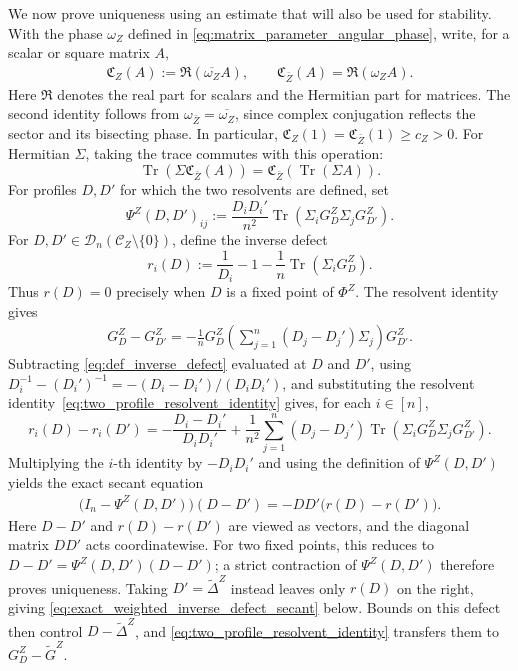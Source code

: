 \documentclass[EJP, preprint, NODS, nobera, nofontexpansion]{ejpecp}
\DeclareMathOperator{\tr}{Tr}
\begin{document}
We now prove uniqueness using an estimate that will also be used for
stability. With the phase \(\omega_Z\) defined in
\eqref{eq:matrix_parameter_angular_phase}, write, for a scalar or square
matrix \(A\),
\begin{align}\label{eq:def_weighted_real_part}
    \mathfrak C_Z(A)
    :=\Re(\overline{\omega_Z}A),
    \qquad
    \mathfrak C_{\bar Z}(A)
    =\Re(\omega_Z A).
\end{align}
Here \(\Re\) denotes the real part for scalars and the Hermitian part for
matrices. The second identity follows from
\(\omega_{\bar Z}=\overline{\omega_Z}\), since complex conjugation reflects
the sector and its bisecting phase. In particular,
\(\mathfrak C_Z(1)=\mathfrak C_{\bar Z}(1)\geq c_Z>0\).
For Hermitian \(\Sigma\), taking the trace commutes with this operation:
\[
    \tr\!\left(\Sigma\mathfrak C_{\bar Z}(A)\right)
    =\mathfrak C_{\bar Z}\!\left(\tr(\Sigma A)\right).
\]
For profiles \(D,D'\) for which the two resolvents are defined, set
\[
    \Psi^Z(D,D')_{ij}
    :=
    \frac{D_iD_i'}{n^2}
    \tr\!\left(
        \Sigma_iG_D^Z\Sigma_jG_{D'}^Z
    \right).
\]
For \(D,D'\in\mathcal D_n(\mathcal C_Z\setminus\{0\})\), define the
inverse defect
\begin{equation}\label{eq:def_inverse_defect}
    r_i(D):=\frac1{D_i}-1-\frac1n\tr(\Sigma_iG_D^Z).
\end{equation}
Thus \(r(D)=0\) precisely when \(D\) is a fixed point of \(\Phi^Z\).
The resolvent identity gives
\begin{align}\label{eq:two_profile_resolvent_identity}
    G_D^Z-G_{D'}^Z
    =
    -\frac1nG_D^Z
    \left(\sum_{j=1}^n(D_j-D_j')\Sigma_j\right)
    G_{D'}^Z.
\end{align}
Subtracting \eqref{eq:def_inverse_defect} evaluated at \(D\) and \(D'\), using
\(D_i^{-1}-(D_i')^{-1}=-(D_i-D_i')/(D_iD_i')\), and substituting the
resolvent identity~\eqref{eq:two_profile_resolvent_identity} gives, for each
\(i\in[n]\),
\[
    r_i(D)-r_i(D')
    =
    -\frac{D_i-D_i'}{D_iD_i'}
    +\frac1{n^2}\sum_{j=1}^n(D_j-D_j')
    \tr\!\left(\Sigma_iG_D^Z\Sigma_jG_{D'}^Z\right).
\]
Multiplying the \(i\)-th identity by \(-D_iD_i'\) and using the definition
of \(\Psi^Z(D,D')\) yields the exact secant equation
\begin{align}\label{eq:two_profile_inverse_defect_secant}
    \bigl(I_n-\Psi^Z(D,D')\bigr)(D-D')
    =
    -DD'\bigl(r(D)-r(D')\bigr).
\end{align}
Here \(D-D'\) and \(r(D)-r(D')\) are viewed as vectors, and the
diagonal matrix \(DD'\) acts coordinatewise. For two fixed
points, this reduces to
\(D-D'=\Psi^Z(D,D')(D-D')\); a strict contraction of \(\Psi^Z(D,D')\)
therefore proves uniqueness. Taking \(D'=\widetilde\Delta^Z\) instead
leaves only \(r(D)\) on the right, giving
\eqref{eq:exact_weighted_inverse_defect_secant} below. Bounds on this
defect then control \(D-\widetilde\Delta^Z\), and
\eqref{eq:two_profile_resolvent_identity} transfers them to
\(G_D^Z-\widetilde G^Z\).
\end{document}

